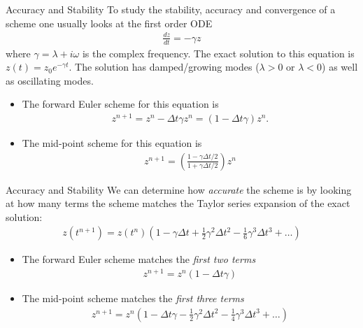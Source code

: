 \documentclass[aspectratio=43]{beamer}
\begin{document}
\begin{frame}{Accuracy and Stability}
  \small%
  To study the stability, accuracy and convergence of a scheme one usually
  looks at the first order ODE
  \begin{align*}
    \frac{dz}{dt} = -\gamma z
  \end{align*}
  where $\gamma = \lambda + i\omega$ is the complex frequency. The
  exact solution to this equation is $z(t) = z_0 e^{-\gamma t}$. The
  solution has damped/growing modes ($\lambda>0$ or $\lambda<0$) as
  well as oscillating modes.

  \begin{itemize}
    \item The forward Euler scheme for this equation is
      \begin{align*}
        z^{n+1} = z^n - \Delta t \gamma z^n = (1-\Delta t\gamma) z^n.
      \end{align*}
    \item The mid-point scheme for this equation is
      \begin{align*}
        z^{n+1} = \left(\frac{1-\gamma\Delta t/2}{1+\gamma\Delta t/2}\right) z^n
      \end{align*}
    \end{itemize}
\end{frame}

\begin{frame}{Accuracy and Stability}
  We can determine how \emph{accurate} the scheme is by looking at how
  many terms the scheme matches the Taylor series expansion of the
  exact solution:
  \begin{align*}
    z(t^{n+1}) = z(t^n)
    \left(
    1 - \gamma\Delta t + \frac{1}{2}\gamma^2 \Delta t^2 - \frac{1}{6}\gamma^3 \Delta t^3 + \ldots
    \right)
  \end{align*}

  \begin{itemize}
  \item The forward Euler scheme matches the \emph{first two terms}
    \begin{align*}
      z^{n+1} = z^n (1-\Delta t\gamma)
    \end{align*}
  \item The mid-point scheme matches the \emph{first three terms}
    \begin{align*}
      z^{n+1} = z^n \left(
      1-\Delta t\gamma - \frac{1}{2}\gamma^2 \Delta t^2  - \frac{1}{4} \gamma^3 \Delta t^3 + \ldots
      \right)
    \end{align*}
  \end{itemize}
\end{frame}
\end{document}
